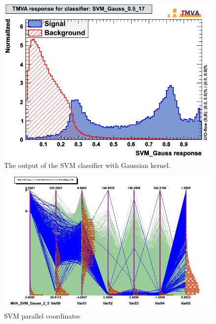 \begin{figure}[h]
  \begin{center}
    \includegraphics[width=.3\textwidth]{images/mk_svm_gauss2}
  \end{center}
  \caption{The output of the SVM classifier with Gaussian kernel.}
  \label{fig:mkSvmGauss2}
\end{figure}

\begin{figure}[h]
  \begin{center}
    \includegraphics[width=.3\textwidth]{images/svm_parallels}
  \end{center}
  \caption{SVM parallel coordinates}
  \label{fig:mkSvmParallels}
\end{figure}

\clearpage